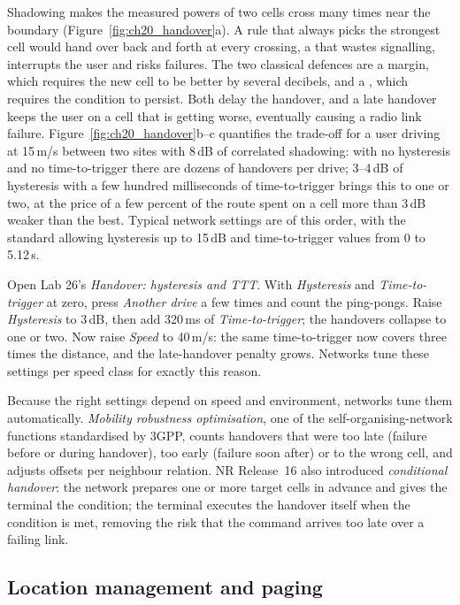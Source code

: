Shadowing makes the measured powers of two cells cross many times near the boundary
(Figure~\ref{fig:ch20_handover}a). A rule that always picks the strongest cell would hand over back and forth at every
crossing, a  that wastes signalling, interrupts the user and risks failures. The two classical
defences are a  margin, which requires the new cell to be better by several decibels, and a
, which requires the condition to persist. Both delay the handover, and a late handover keeps the
user on a cell that is getting worse, eventually causing a radio link failure. Figure~\ref{fig:ch20_handover}b--c
quantifies the trade-off for a user driving at 15\,m/s between two sites with 8\,dB of correlated shadowing: with no
hysteresis and no time-to-trigger there are dozens of handovers per drive; 3--4\,dB of hysteresis with a few hundred
milliseconds of time-to-trigger brings this to one or two, at the price of a few percent of the route spent on a cell
more than 3\,dB weaker than the best. Typical network settings are of this order, with the standard allowing hysteresis
up to 15\,dB and time-to-trigger values from 0 to 5.12\,s.

\begin{tryit}
Open Lab 26's \emph{Handover: hysteresis and TTT}. With \emph{Hysteresis} and \emph{Time-to-trigger} at zero, press
\emph{Another drive} a few times and count the ping-pongs. Raise \emph{Hysteresis} to 3\,dB, then add 320\,ms of
\emph{Time-to-trigger}; the handovers collapse to one or two. Now raise \emph{Speed} to 40\,m/s: the same
time-to-trigger now covers three times the distance, and the late-handover penalty grows. Networks tune these
settings per speed class for exactly this reason.
\end{tryit}

Because the right settings depend on speed and environment, networks tune them automatically. \emph{Mobility robustness
optimisation}, one of the self-organising-network functions standardised by 3GPP, counts handovers that were too late
(failure before or during handover), too early (failure soon after) or to the wrong cell, and adjusts offsets per
neighbour relation. NR Release~16 also introduced \emph{conditional handover}: the network prepares one or more target
cells in advance and gives the terminal the condition; the terminal executes the handover itself when the condition is
met, removing the risk that the command arrives too late over a failing link.

\subsection{Location management and paging}

